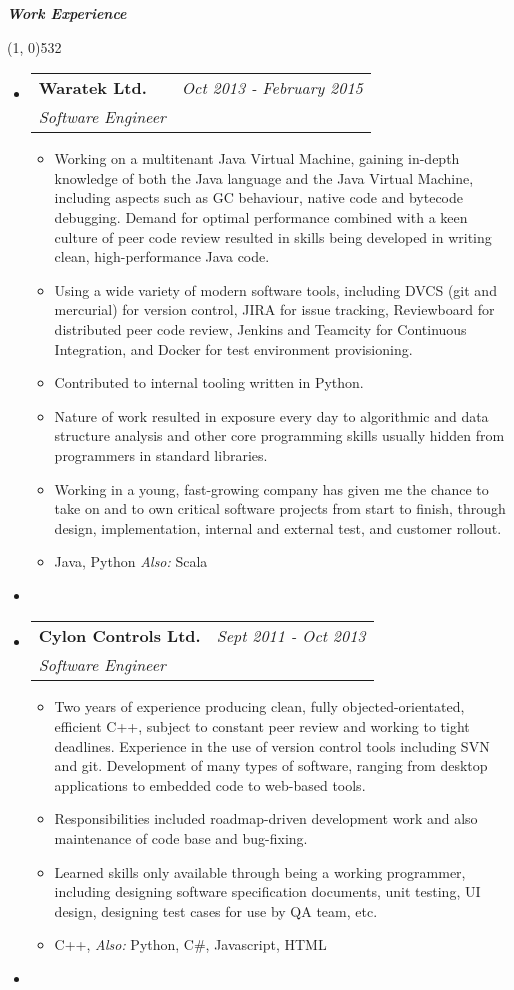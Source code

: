 \documentclass[a4,11pt]{article}
\makeatletter
\newcommand{\resitem}[1]{\item #1 \vspace{-0pt}}
\newcommand{\resheading}[1]{\large \colorbox{mycolour}{\begin{minipage}{\textwidth}{\textbf{#1 \vphantom{p\^{E}}}}\end{minipage}}}
\newcommand{\ressubheading}[4]{
\begin{tabular*}{7.0in}{l@{\extracolsep{\fill}}r}
		\textbf{#1} & \textit{#2} \\
		\textit{#3} & \textit{#4} \\
\end{tabular*}\vspace{-5pt}}
\makeatother
\begin{document}
\resheading{\textit{Work Experience}\vspace{-5mm}}
 \line(1, 0){532}
  \vspace{-0.07in}
\begin{itemize}

\item
	\ressubheading{Waratek Ltd.}{Oct 2013 - February 2015}{Software Engineer}{}
	\begin{itemize}
			\resitem{Working on a multitenant Java Virtual Machine, gaining in-depth knowledge of both the Java language and the Java Virtual Machine, including aspects such as GC behaviour, native code and bytecode debugging. Demand for optimal performance combined with a keen culture of peer code review resulted in skills being developed in writing clean, high-performance Java code.}
                          \resitem{ Using a wide variety of modern software tools, including DVCS (git and mercurial) for version control, JIRA for issue tracking, Reviewboard for distributed peer code review, Jenkins and Teamcity for Continuous Integration, and Docker for test environment provisioning.}
			\resitem{Contributed to internal tooling written in Python.}
		\resitem{Nature of work resulted in exposure every day to algorithmic and data structure analysis and other core programming skills usually hidden from programmers in standard libraries.}
		\resitem{Working in a young, fast-growing company has given me the chance to take on and to own critical software projects from start to finish, through design, implementation, internal and external test, and customer rollout.}
		\resitem{Java, Python \emph{Also:} Scala}
	\end{itemize}
\item

  \vspace{-6mm}

\item
	\ressubheading{Cylon Controls Ltd.}{Sept 2011 - Oct 2013}{Software Engineer}{}
	\begin{itemize}
			\resitem{Two years of experience producing clean, fully objected-orientated, efficient C++, subject to constant peer review and working to tight deadlines. Experience in the use of version control tools including SVN and git. Development of many types of software, ranging from desktop applications to embedded code to web-based tools. }
		\resitem{Responsibilities included roadmap-driven development work and also maintenance of code base and bug-fixing. }
		\resitem{Learned skills only available through being a working programmer, including designing software specification documents, unit testing, UI design, designing test cases for use by QA team, etc.}
		\resitem{C++, \emph{Also:} Python, C\#, Javascript, HTML}
	\end{itemize}
\item

\end{itemize}
\end{document}
